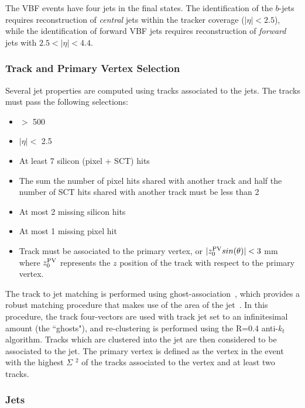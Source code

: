 \label{sec:vbf-objsel}

The VBF \Hbb events have four jets in the final states.
The identification of the $b$-jets requires reconstruction of
{\it central} jets within the tracker coverage ($|\eta|<2.5$), while
the identification of forward VBF jets requires reconstruction
of {\it forward} jets with $2.5<|\eta|<4.4$. 


\subsubsection{Track and Primary Vertex Selection}

Several jet properties are computed using tracks associated to the jets. The tracks must pass the following selections:

\begin{itemize}
\item \pT $>$ 500 \mev
\item $|\eta| < $ 2.5
\item At least 7 silicon (pixel + SCT) hits
\item The sum the number of pixel hits shared with another track and half the number of SCT hits shared with another track must be less than 2
\item At most 2 missing silicon hits
\item At most 1 missing pixel hit
\item Track must be associated to the primary vertex, or $|z_0^{\rm PV}sin(\theta)| < 3$ mm  where $z_0^{\rm PV}$ represents the $z$ position of the track with respect to the primary vertex.
\end{itemize}

The track to jet matching is performed using ghost-association~\cite{GhostMatching,jetareas,atlasjetsub}, which provides a robust matching procedure that makes use of the area of the jet~\cite{GhostMatching}. In this procedure, the track four-vectors are used with track jet \pT set to an infinitesimal amount (the ``ghosts"), and re-clustering is performed using the R=0.4 anti-$k_t$
algorithm.  Tracks which are clustered into the jet are then considered to be associated to the jet.  
The primary vertex is defined as the vertex in the event with the highest $\Sigma$ \pT$^2$ of the tracks associated to the vertex and at least two tracks.


\subsubsection{Jets}
\label{sec:vbf-jets}

